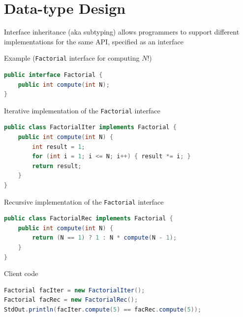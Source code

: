 \documentclass[8pt,a4paper,compress]{beamer}
\begin{document}
\section{Data-type Design}
\begin{frame}[fragile]
\pause

Interface inheritance (aka subtyping) allows programmers to support different implementations for the same API, specified as an interface

\pause\bigskip

Example (\lstinline{Factorial} interface for computing $N!$)

\smallskip

\begin{lstlisting}[language=Java,style=focusin]
public interface Factorial {
    public int compute(int N);
}
\end{lstlisting}

\pause\smallskip

Iterative implementation of the \lstinline{Factorial} interface

\smallskip

\begin{lstlisting}[language=Java,style=focusin]
public class FactorialIter implements Factorial {
    public int compute(int N) {
        int result = 1;
        for (int i = 1; i <= N; i++) { result *= i; }
        return result;
    }
}
\end{lstlisting}

\pause\smallskip

Recursive implementation of the \lstinline{Factorial} interface

\smallskip

\begin{lstlisting}[language=Java,style=focusin]
public class FactorialRec implements Factorial {
    public int compute(int N) {
        return (N == 1) ? 1 : N * compute(N - 1);
    }
}
\end{lstlisting}

\pause\smallskip

Client code

\smallskip

\begin{lstlisting}[language=Java,style=focusin]
Factorial facIter = new FactorialIter();
Factorial facRec = new FactorialRec();
StdOut.println(facIter.compute(5) == facRec.compute(5));
\end{lstlisting}
\end{frame}
\end{document}

